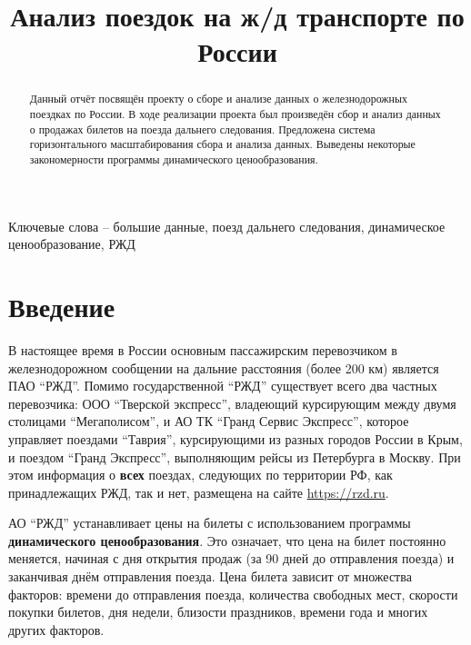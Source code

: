\documentclass[conference]{IEEEtran}
\begin{document}
\title{Анализ поездок на ж/д транспорте по России}

\author{
\and
{}
}

\maketitle

\begin{abstract}
Данный отчёт посвящён проекту о сборе и анализе данных о железнодорожных поездках по России. В ходе реализации проекта был произведён сбор и анализ данных о продажах билетов на поезда дальнего следования. Предложена система горизонтального масштабирования сбора и анализа данных. Выведены некоторые закономерности программы динамического ценообразования.
\end{abstract}

Ключевые слова -- большие данные, поезд дальнего следования, динамическое ценообразование, РЖД


\section{Введение}
В настоящее время в России основным пассажирским перевозчиком в железнодорожном сообщении на дальние расстояния (более 200 км) является ПАО ``РЖД''. Помимо государственной ``РЖД'' существует всего два частных перевозчика: ООО ``Тверской экспресс'', владеющий курсирующим между двумя столицами ``Мегаполисом'', и АО ТК ``Гранд Сервис Экспресс'', которое управляет поездами ``Таврия'', курсирующими из разных городов России в Крым, и поездом ``Гранд Экспресс'', выполняющим рейсы из Петербурга в Москву. При этом информация о \textbf{всех} поездах, следующих по территории РФ, как принадлежащих РЖД, так и нет, размещена на сайте \href{https://rzd.ru}{https://rzd.ru}.

АО ``РЖД'' устанавливает цены на билеты с использованием программы \textbf{динамического ценообразования}. Это означает, что цена на билет постоянно меняется, начиная с дня открытия продаж (за 90 дней до отправления поезда) и заканчивая днём отправления поезда. Цена билета зависит от множества факторов: времени до отправления поезда, количества свободных мест, скорости покупки билетов, дня недели, близости праздников, времени года и многих других факторов.
\end{document}
